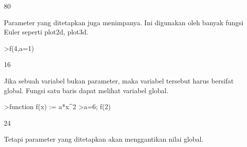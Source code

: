 \documentclass{article}
\begin{document}
\begin{eulernotebook}
\begin{euleroutput}
  80
\end{euleroutput}
\begin{eulercomment}
Parameter yang ditetapkan juga menimpanya. Ini digunakan oleh banyak
fungsi Euler seperti plot2d, plot3d.
\end{eulercomment}
\begin{eulerprompt}
>f(4,a=1)
\end{eulerprompt}
\begin{euleroutput}
  16
\end{euleroutput}
\begin{eulercomment}
Jika sebuah variabel bukan parameter, maka variabel tersebut harus
bersifat global. Fungsi satu baris dapat melihat variabel global.
\end{eulercomment}
\begin{eulerprompt}
>function f(x) := a*x^2
>a=6; f(2)
\end{eulerprompt}
\begin{euleroutput}
  24
\end{euleroutput}
\begin{eulercomment}
Tetapi parameter yang ditetapkan akan menggantikan nilai global.



\end{eulercomment}
\end{eulernotebook}
\end{document}
